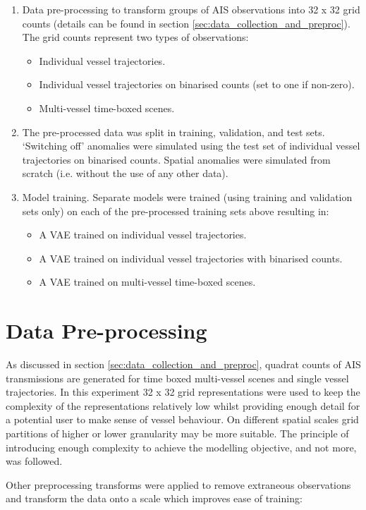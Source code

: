 \documentclass{mldsmsc}
\begin{document}
\begin{enumerate}
	\item Data pre-processing to transform groups of  AIS observations into 32 x 32  grid counts (details can be found in section \ref{sec:data_collection_and_preproc}). The grid counts represent two types of observations: 
	\begin{itemize}
		\item Individual vessel trajectories.
		\item Individual vessel trajectories on binarised counts (set to one if non-zero).
		\item Multi-vessel time-boxed scenes.
	\end{itemize}
	\item The pre-processed data was split in training, validation, and test sets. `Switching off' anomalies were simulated using the test set of individual vessel trajectories on binarised counts. Spatial anomalies were simulated from scratch (i.e. without the use of any other data). 
	\item Model training. Separate models were trained (using training and validation sets only) on each of the pre-processed training sets above resulting in:
	\begin{itemize}
		\item A VAE trained on individual vessel trajectories.
		\item A VAE trained on individual vessel trajectories with binarised counts.
		\item A VAE trained on multi-vessel time-boxed scenes.
	\end{itemize}
	
\end{enumerate}
\section{Data Pre-processing}
As discussed in section \ref{sec:data_collection_and_preproc}, quadrat counts of AIS transmissions are generated for time boxed multi-vessel scenes and single vessel trajectories. In this experiment 32 x 32 grid representations were used to keep the complexity of the representations relatively low whilst providing enough detail for a potential user to make sense of vessel behaviour. On different spatial scales grid partitions of higher or lower granularity may be more suitable. The principle of introducing enough complexity to achieve the modelling objective, and not more, was followed.

Other preprocessing transforms were applied to remove extraneous observations and transform the data onto a scale which improves ease of training:
\end{document}
